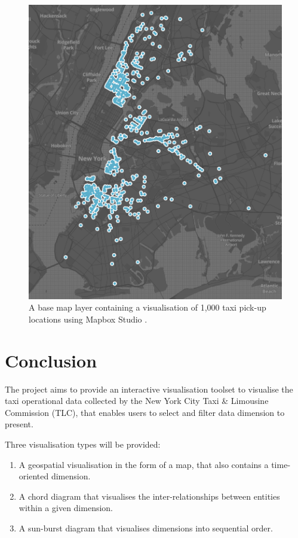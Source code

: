 \documentclass[11pt,a4paper]{article}
\begin{document}
\begin{figure}[H]
	\centering
	\includegraphics[width=\textwidth,keepaspectratio]{figures/fig18.png}
	\caption{\label{fig:20}A base map layer containing a visualisation of 1,000 taxi pick-up locations using Mapbox Studio \parencite{Mapbox2017}. }
\end{figure}

\section{Conclusion}
The project aims to provide an interactive visualisation toolset to visualise the taxi operational data collected by the New York City Taxi \& Limousine Commission (TLC), that enables users to select and filter data dimension to present.

Three visualisation types will be provided:
\begin{enumerate}
	\item A geospatial visualisation in the form of a map, that also contains a time-oriented dimension.
	\item A chord diagram that visualises the inter-relationships between entities within a given dimension.
	\item A sun-burst diagram that visualises dimensions into sequential order.
\end{enumerate}
\end{document}

